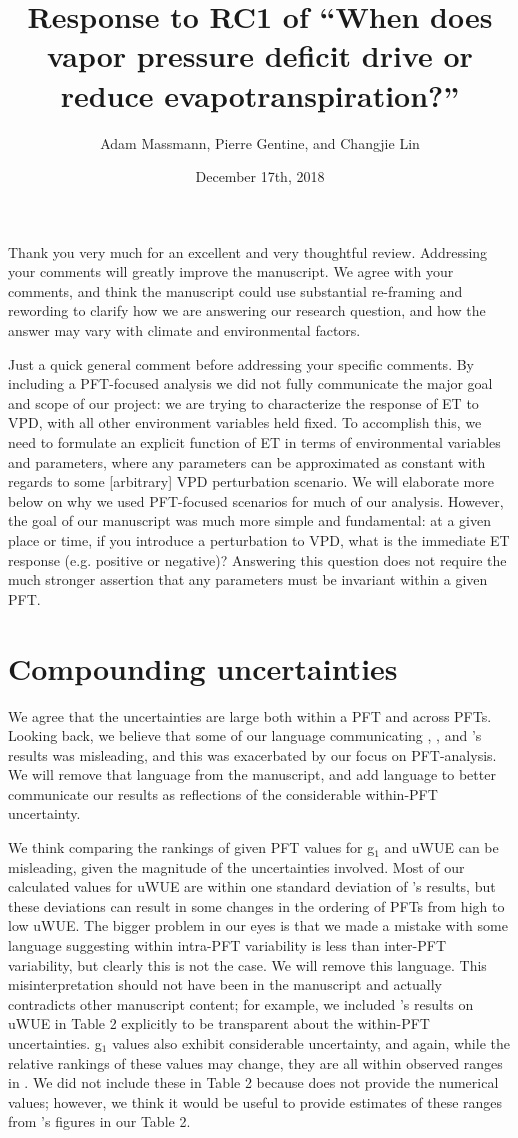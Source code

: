 \documentclass[12pt]{article}
\title{Response to RC1 of ``When does vapor pressure deficit drive or
  reduce evapotranspiration?''}
\author{Adam Massmann, Pierre Gentine, and Changjie Lin}
\date{December 17th, 2018}
\begin{document}
Thank you very much for an excellent and very thoughtful
review. Addressing your comments will greatly improve the
manuscript. We agree with your comments, and think the manuscript
could use substantial re-framing and rewording to clarify how we are
answering our research question, and how the answer may vary with
climate and environmental factors.

Just a quick general comment before addressing your specific
comments. By including a PFT-focused analysis we did not fully
communicate the major goal and scope of our project: we are trying to
characterize the response of ET to VPD, with all other environment
variables held fixed. To accomplish this, we need to formulate an
explicit function of ET in terms of environmental variables and
parameters, where any parameters can be approximated as constant with
regards to some [arbitrary] VPD perturbation scenario. We will
elaborate more below on why we used PFT-focused scenarios for much of
our analysis. However, the goal of our manuscript was much more simple
and fundamental: at a given place or time, if you introduce a
perturbation to VPD, what is the immediate ET response (e.g. positive
or negative)? Answering this question does not require the much
stronger assertion that any parameters must be invariant within a
given PFT.

\section{Compounding uncertainties}

We agree that the uncertainties are large both within a PFT and across
PFTs. Looking back, we believe that some of our language
communicating \cite{Lin_2018}, \cite{Medlyn_2017}, and
\cite{Zhou_2014}'s results was misleading, and this was exacerbated by
our focus on PFT-analysis. We will remove that language from the
manuscript, and add language to better communicate our results as
reflections of the considerable within-PFT uncertainty.

We think comparing the rankings of given PFT values for g$_1$ and uWUE
can be misleading, given the magnitude of the uncertainties
involved. Most of our calculated values for uWUE are within one
standard deviation of \cite{Zhou_2015}'s results, but these deviations
can result in some changes in the ordering of PFTs from high to low
uWUE. The bigger problem in our eyes is that we made a mistake with
some language suggesting within intra-PFT variability is less than
inter-PFT variability, but clearly this is not the case. We will
remove this language. This misinterpretation should not have been in
the manuscript and actually contradicts other manuscript content; for
example, we included \cite{Zhou_2015}'s results on uWUE in Table 2
explicitly to be transparent about the within-PFT uncertainties. g$_1$
values also exhibit considerable uncertainty, and again, while the
relative rankings of these values may change, they are all within
observed ranges in \cite{Medlyn_2017}. We did not include these in
Table 2 because \cite{Medlyn_2017} does not provide the numerical
values; however, we think it would be useful to provide estimates of
these ranges from \cite{Medlyn_2017}'s figures in our Table 2.
\end{document}
